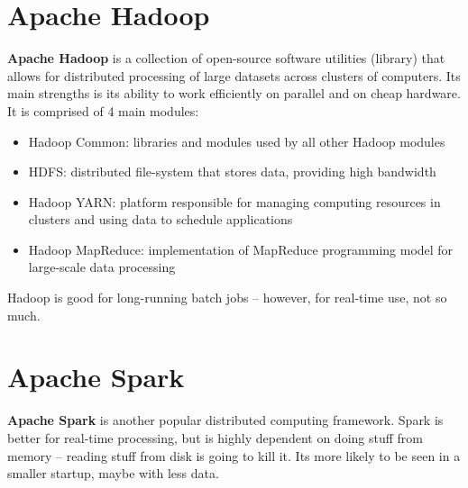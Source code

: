 \documentclass{report}
\newcommand{\npar}{\par\noindent}
\begin{document}
\section{Apache Hadoop}

\par \textbf{Apache Hadoop} is a collection of open-source software utilities (library) that allows for distributed processing of large datasets across clusters of computers. Its main strengths is its ability to work efficiently on parallel and on cheap hardware. It is comprised of 4 main modules:

\begin{itemize}
    \item Hadoop Common: libraries and modules used by all other Hadoop modules
    \item HDFS: distributed file-system that stores data, providing high bandwidth
    \item Hadoop YARN: platform responsible for managing computing resources in clusters and using data to schedule applications
    \item Hadoop MapReduce: implementation of MapReduce programming model for large-scale data processing
\end{itemize}

\npar Hadoop is good for long-running batch jobs -- however, for real-time use, not so much.

\section{Apache Spark}

\par \textbf{Apache Spark} is another popular distributed computing framework. Spark is better for real-time processing, but is highly dependent on doing stuff from memory -- reading stuff from disk is going to kill it. Its more likely to be seen in a smaller startup, maybe with less data.
\end{document}
